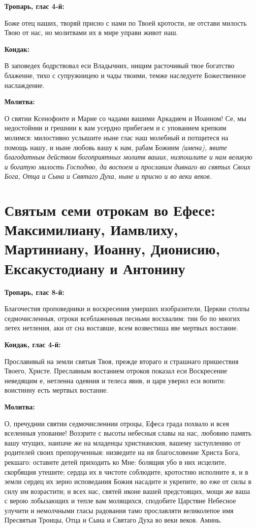 \bfseries Тропарь, глас 4-й:\normalfont{}


Боже отец наших, творяй присно с нами по Твоей кротости, не отстави милость Твою от нас, но молитвами их в мире управи живот наш.


\medskip
\bfseries Кондак:\normalfont{}


В заповедех бодрствовал еси Владычних, нищим расточивый твое богатство блаженне, тихо с супружницею и чады твоими, темже наследуете Божественное наслаждение.


\medskip
\bfseries Молитва:\normalfont{}


О святии Ксенофонте и Марие со чадами вашими Аркадием и Иоанном! Се, мы недостойнии и грешнии к вам усердно прибегаем и с упованием крепким молимся: милостивно услышите ныне глас наш молебный и потщитеся на помощь нашу, и ныне любовь вашу к нам, рабам Божиим \itshape (имена)\normalfont{}, явите благодатным действом богоприятных молитв ваших, низпошлите и нам великую и богатую милость Господню, да воспоем и прославим дивнаго во святых Своих Бога, Отца и Сына и Святаго Духа, ныне и присно и во веки веков.


 

\section{Святым семи отрокам во Ефесе: Максимилиану, Иамвлиху, Мартиниану, Иоанну, Дионисию, Ексакустодиану и Антонину}
 
\bfseries Тропарь, глас 8-й:\normalfont{}


Благочестия проповедники и воскресения умерших изобразители, Церкви столпы седмочисленныя, отроки всеблаженныя песньми восхвалим: тии бо по многих летех нетления, аки от сна воставше, всем возвестиша яве мертвых востание.


\medskip
\bfseries Кондак, глас 4-й:\normalfont{}


Прославивый на земли святыя Твоя, прежде втораго и страшнаго пришествия Твоего, Христе. Преславным востанием отроков показал еси Воскресение неведящим е, нетленна одеяния и телеса явив, и царя уверил еси вопити: воистинну есть мертвых востание.


\medskip
\bfseries Молитва:\normalfont{}


О, пречуднии святии седмочисленнии отроцы, Ефеса града похвало и всея вселенныя упование! Воззрите с высоты небесныя славы на нас, любовию память вашу чтущих, наипаче же на младенцы христианския, вашему заступлению от родителей своих препорученныя: низведите на ня благословение Христа Бога, рекшаго: оставите детей приходить ко Мне: болящия убо в них исцелите, скорбящия утешите; сердца их в чистоте соблюдите, кротостию исполните я, и в земли сердец их зерно исповедания Божия насадите и укрепите, во еже от силы в силу им возрастити; и всех нас, святей иконе вашей предстоящих, мощи же ваша с верою лобызающих и тепле вам молящихся, сподобите Царствие Небесное улучити и немолчными гласы радования тамо прославляти великолепое имя Пресвятыя Троицы, Отца и Сына и Святаго Духа во веки веков. Аминь.

